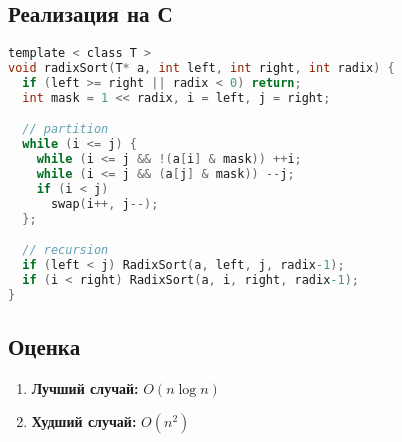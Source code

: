 \documentclass[a5paper,10pt]{article}
\begin{document}
		\subsection{Реализация на С}
			\begin{lstlisting}[frame=single,language=C]
template < class T >
void radixSort(T* a, int left, int right, int radix) {
  if (left >= right || radix < 0) return;
  int mask = 1 << radix, i = left, j = right;

  // partition
  while (i <= j) {
	while (i <= j && !(a[i] & mask)) ++i;
	while (i <= j && (a[j] & mask)) --j;
	if (i < j)
	  swap(i++, j--);
  };

  // recursion
  if (left < j) RadixSort(a, left, j, radix-1);
  if (i < right) RadixSort(a, i, right, radix-1);
}
			\end{lstlisting}

		\subsection{Оценка}
			\begin{enumerate}
				\item \textbf{Лучший случай:} $ O(n \log n) $
				\item \textbf{Худший случай:} $ O(n^2) $
			\end{enumerate}
			
\end{document}
